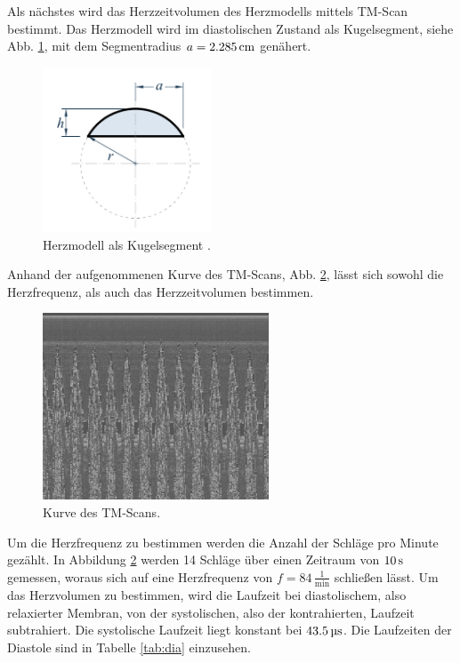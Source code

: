 \noindent Als nächstes wird das Herzzeitvolumen des Herzmodells mittels TM-Scan bestimmt.
Das Herzmodell wird im diastolischen Zustand als Kugelsegment, siehe Abb. \ref{fig:kugel},
mit dem Segmentradius $a=2.285\,\si{\centi\meter}$ genähert.
\begin{figure}[H]
  \centering
  \includegraphics[width=5cm]{bilder/kugel.png}
  \caption{Herzmodell als Kugelsegment \cite{kugel}.}
  \label{fig:kugel}
\end{figure}
\noindent Anhand der aufgenommenen Kurve des TM-Scans, Abb. \ref{fig:tm}, lässt sich sowohl die
Herzfrequenz, als auch das Herzzeitvolumen bestimmen.
\begin{figure}[H]
  \centering
  \includegraphics[width=0.6\textwidth]{bilder/TM-ScanHerz2.jpg}
  \caption{Kurve des TM-Scans.}
  \label{fig:tm}
\end{figure}
\noindent Um die Herzfrequenz zu bestimmen werden die Anzahl der Schläge pro Minute
gezählt. In Abbildung \ref{fig:tm} werden 14 Schläge über einen Zeitraum von
$10\,\si{\second}$ gemessen, woraus sich auf eine Herzfrequenz von $f = 84\,\frac{1}{\si{\minute}}$
schließen lässt.
Um das Herzvolumen zu bestimmen, wird die Laufzeit bei diastolischem, also
relaxierter Membran, von der systolischen, also der kontrahierten, Laufzeit
subtrahiert. Die systolische Laufzeit liegt konstant bei $43.5\,\si{\micro\second}$.
 Die
Laufzeiten der Diastole sind in Tabelle \ref{tab:dia} einzusehen.
